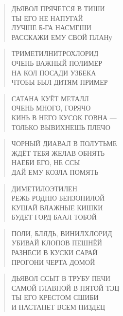 \poemtitle{***}
\begin{verse}
ДЬЯВОЛ ПРЯЧЕТСЯ В ТИШИ\\
ТЫ ЕГО НЕ НАПУГАЙ\\
ЛУЧШЕ Б-ГА НАСМЕШИ\\
РАССКАЖИ ЕМУ СВОЙ ПЛАНу
\end{verse}

\poemtitle{***}
\begin{verse}
ТРИМЕТИЛНИТРОХЛОРИД\\
ОЧЕНЬ ВАЖНЫЙ ПОЛИМЕР\\
НА КОЛ ПОСАДИ УЗБЕКА\\
ЧТОБЫ БЫЛ ДИТЯМ ПРИМЕР
\end{verse}

\poemtitle{***}
\begin{verse}
САТАНА КУЁТ МЕТАЛЛ\\
ОЧЕНЬ МНОГО, ГОРЯЧО\\
КИНЬ В НЕГО КУСОК ГОВНА —\\
ТОЛЬКО ВЫВИХНЕШЬ ПЛЕЧО
\end{verse}

\poemtitle{***}
\begin{verse}
ЧОРНЫЙ ДИАВАЛ В ПОЛУТЬМЕ\\
ЖДЁТ ТЕБЯ ЖЕЛАВ ОБНЯТЬ\\
НАЕБИ ЕГО, НЕ ССЫ\\
ДАЙ ЕМУ КОЗЛА ПОМЯТЬ
\end{verse}

\poemtitle{***}
\begin{verse}
ДИМЕТИЛОЭТИЛЕН\\
РЕЖЬ РОДНЮ БЕНЗОПИЛОЙ\\
КУШАЙ ВЛАЖНЫЕ КИШКИ\\
БУДЕТ ГОРД БААЛ ТОБОЙ
\end{verse}

\poemtitle{***}
\begin{verse}
ПОЛИ, БЛЯДЬ, ВИНИЛХЛОРИД\\
УБИВАЙ КЛОПОВ ПЕШНЁЙ\\
РАЗНЕСИ В КУСКИ САРАЙ\\
ПРОГОНИ ЧЕРТА ДОМОЙ
\end{verse}

\poemtitle{***}
\begin{verse}
ДЬЯВОЛ ССЫТ В ТРУБУ ПЕЧИ\\
САМОЙ ГЛАВНОЙ В ПЯТОЙ ТЭЦ\\
ТЫ ЕГО КРЕСТОМ СШИБИ\\
И НАСТАНЕТ ВСЕМ ПИЗДЕЦ
\end{verse}

